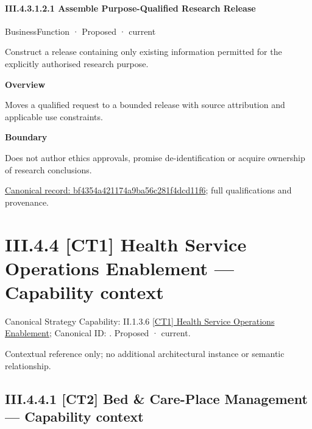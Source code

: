 \paragraph*{III.4.3.1.2.1 Assemble Purpose-Qualified Research Release}
\label{navigation:III.4.3.1.2.1}

\label{element:bf4354a421174a9ba56c281f4dcd11f6}
{\small BusinessFunction · Proposed · current}\par

Construct a release containing only existing information permitted for the explicitly authorised research purpose.



\textbf{Overview}



Moves a qualified request to a bounded release with source attribution and applicable use constraints.



\textbf{Boundary}



Does not author ethics approvals, promise de-identification or acquire ownership of research conclusions.


{\footnotesize \href{../../../../continuum/business/business-function/bf4354a421174a9ba56c281f4dcd11f6.md}{Canonical record: bf4354a421174a9ba56c281f4dcd11f6}; full qualifications and provenance.}\par
\section*{III.4.4 [CT1] Health Service Operations Enablement — Capability context}
\label{navigation:III.4.4}

{\small Canonical Strategy Capability: II.1.3.6 \hyperref[element:b13ee2c5a4ef4fd6be8a44795696dfc2]{[CT1] Health Service Operations Enablement}; Canonical ID: \texttt{}. Proposed · current.}\par
Contextual reference only; no additional architectural instance or semantic relationship.\par
\subsection*{III.4.4.1 [CT2] Bed \& Care-Place Management — Capability context}
\label{navigation:III.4.4.1}

